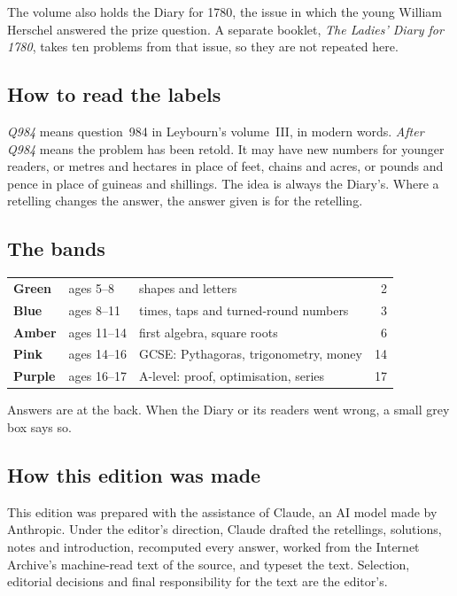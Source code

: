 \documentclass[11pt,a4paper]{article}
\newcounter{prob}
\begin{document}
The volume also holds the Diary for 1780, the issue in which the young William Herschel
answered the prize question. A separate booklet, \textit{The Ladies' Diary for 1780},
takes ten problems from that issue, so they are not repeated here.

\subsection*{How to read the labels}

\textit{Q984} means question~984 in Leybourn's volume~III, in modern words.
\textit{After Q984} means the problem has been retold. It may have new numbers for
younger readers, or metres and hectares in place of feet, chains and acres, or pounds
and pence in place of guineas and shillings. The idea is always the Diary's. Where a
retelling changes the answer, the answer given is for the retelling.

\subsection*{The bands}

\begin{center}
\begin{tabular}{>{\bfseries}l l l r}
\color{bandgreen}Green  & ages 5--8   & shapes and letters                     & 2\\
\color{bandblue}Blue    & ages 8--11  & times, taps and turned-round numbers   & 3\\
\color{bandamber}Amber  & ages 11--14 & first algebra, square roots            & 6\\
\color{bandpink}Pink    & ages 14--16 & GCSE: Pythagoras, trigonometry, money  & 14\\
\color{bandpurple}Purple & ages 16--17 & A-level: proof, optimisation, series  & 17\\
\end{tabular}
\end{center}

Answers are at the back. When the Diary or its readers went wrong, a small grey box
says so.

\subsection*{How this edition was made}
This edition was prepared with the assistance of Claude, an AI model made by Anthropic.
Under the editor's direction, Claude drafted the retellings, solutions, notes and
introduction, recomputed every answer, worked from the Internet Archive's machine-read
text of the source, and typeset the text. Selection, editorial decisions and final
responsibility for the text are the editor's.
\end{document}
